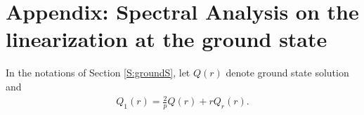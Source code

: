 \documentclass[12pt]{amsart}
\newcommand{\p}{\partial}
\begin{document}
\section{Appendix: Spectral Analysis on the linearization at the ground state}\label{S:App}


In the notations of Section \ref{S:groundS}, 
let $Q(r)$ denote ground state solution and 
\begin{align*}
Q_1(r)
=\tfrac 2pQ(r)+rQ_r(r).
\end{align*}
\end{document}
